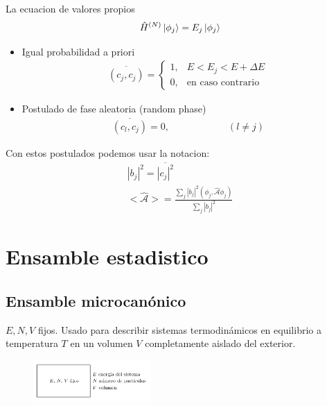 \documentclass{article}
\newcommand{\caja}[3]{%
  \begin{tcolorbox}[colback=#1!5!white,colframe=#1!25!black,title=#2]
    #3
  \end{tcolorbox}%
}
\begin{document}
La ecuacion de valores propios 
\begin{gather*}
  \hat H ^ {(N )} \ket{\phi_j } = E_j \ket{\phi_j }   
\end{gather*}

\caja{green}{Postulados }{
  \begin{itemize}
    \item Igual probabilidad a priori 
      \begin{gather*}
        \overline{(c_j, c_j )} = 
          \left\{\begin{array}{lr}
              1, & E<E_j<E+\Delta E \\
              0, & \text{en caso contrario}
          \end{array}\right.
      \end{gather*}
    \item Postulado de fase aleatoria (random phase) 
      \begin{gather*}
        \overline{(c_l, c_j )}  = 0, \qquad \qquad \qquad (l\neq j )
      \end{gather*}
  \end{itemize}
}
Con estos postulados podemos usar la notacion: 
\begin{gather*}
  \left|b_j \right| ^2 = \overline{\left|c_j \right|^2 } \\
  <\hat{\mathcal A}> = \frac{\displaystyle\sum_{j }^{} \left|b_j \right|^2 (\phi_j, \hat{\mathcal A }\phi_j )}{\displaystyle\sum_{j }^{} \left|b_j \right|^2 }
\end{gather*}

\section{Ensamble estadistico }
\subsection{Ensamble microcanónico }
$ E,N,V  $ fijos. Usado para describir sistemas termodinámicos en equilibrio a temperatura $ T  $ en un volumen $ V  $ completamente aislado del exterior.
\begin{figure}[H]
  \begin{center}
    \includegraphics[width=0.4\textwidth]{microcanonico.png}
  \end{center}
\end{figure}
\end{document}
